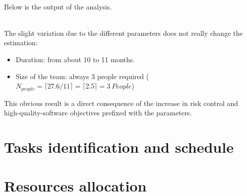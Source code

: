 \documentclass[a4paper,11pt]{report} %
\begin{document}
			\pagebreak\\
			Below is the output of the analysis.\bigskip\\
			\begin{minipage}{\linewidth}
			\end{minipage}
			\bigskip\\
			The slight variation due to the different parameters does not really change the estimation:
			\begin{itemize}
				\item Duration: from about 10 to 11 months.
				\item Size of the team: always 3 people required  (\(N_{people} = \lceil 27.6 / 11 \rceil = \lceil 2.5 \rceil = 3 \ People\))
			\end{itemize}
			\bigskip
			This obvious result is a direct consequence of the increase in risk control and high-quality-software objectives prefixed with the parameters.
			
	\pagebreak
	\section{Tasks identification and schedule}	
	
	\section{Resources allocation}	
	
\end{document}
